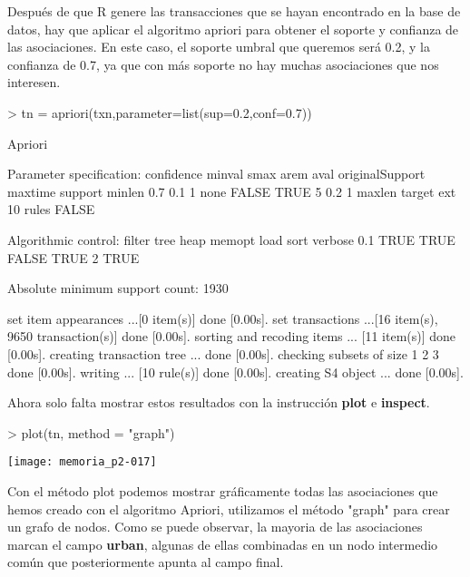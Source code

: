 \documentclass [a4paper] {article}
\begin{document}
Después de que R genere las transacciones que se hayan encontrado en la base de datos, hay que aplicar el algoritmo 
apriori para obtener el soporte y confianza de las asociaciones. En este caso, el soporte umbral que queremos será
0.2, y la confianza de 0.7, ya que con más soporte no hay muchas asociaciones que nos interesen.
\begin{Schunk}
\begin{Sinput}
> tn = apriori(txn,parameter=list(sup=0.2,conf=0.7))
\end{Sinput}
\begin{Soutput}
Apriori

Parameter specification:
 confidence minval smax arem  aval originalSupport maxtime support minlen
        0.7    0.1    1 none FALSE            TRUE       5     0.2      1
 maxlen target   ext
     10  rules FALSE

Algorithmic control:
 filter tree heap memopt load sort verbose
    0.1 TRUE TRUE  FALSE TRUE    2    TRUE

Absolute minimum support count: 1930 

set item appearances ...[0 item(s)] done [0.00s].
set transactions ...[16 item(s), 9650 transaction(s)] done [0.00s].
sorting and recoding items ... [11 item(s)] done [0.00s].
creating transaction tree ... done [0.00s].
checking subsets of size 1 2 3 done [0.00s].
writing ... [10 rule(s)] done [0.00s].
creating S4 object  ... done [0.00s].
\end{Soutput}
\end{Schunk}
Ahora solo falta mostrar estos resultados con la instrucción \textbf{plot} e \textbf{inspect}.
\begin{Schunk}
\begin{Sinput}
> plot(tn, method = "graph")
\end{Sinput}
\end{Schunk}
\texttt{[image: memoria\_p2-017]}

Con el método plot podemos mostrar gráficamente todas las asociaciones que hemos creado con el algoritmo Apriori, utilizamos el método
"graph" para crear un grafo de nodos. Como se puede observar, la mayoria de las asociaciones marcan el campo \textbf{urban}, algunas de ellas
combinadas en un nodo intermedio común que posteriormente apunta al campo final.
\end{document}
